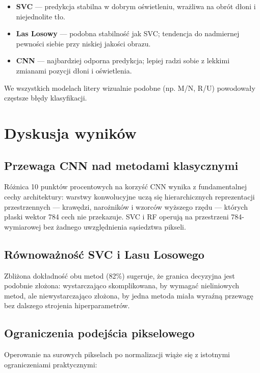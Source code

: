 \begin{itemize}
    \item \textbf{SVC} --- predykcja stabilna w dobrym oświetleniu, wrażliwa
          na obrót dłoni i niejednolite tło.
    \item \textbf{Las Losowy} --- podobna stabilność jak SVC; tendencja do
          nadmiernej pewności siebie przy niskiej jakości obrazu.
    \item \textbf{CNN} --- najbardziej odporna predykcja; lepiej radzi sobie
          z lekkimi zmianami pozycji dłoni i oświetlenia.
\end{itemize}

We wszystkich modelach litery wizualnie podobne (np. M/N, R/U) powodowały
częstsze błędy klasyfikacji.

\section{Dyskusja wyników}

\subsection{Przewaga CNN nad metodami klasycznymi}

Różnica 10 punktów procentowych na korzyść CNN wynika z fundamentalnej cechy
architektury: warstwy konwolucyjne uczą się hierarchicznych reprezentacji
przestrzennych --- krawędzi, narożników i wzorców wyższego rzędu --- których
płaski wektor 784 cech nie przekazuje. SVC i RF operują na przestrzeni
784-wymiarowej bez żadnego uwzględnienia sąsiedztwa pikseli.

\subsection{Równoważność SVC i Lasu Losowego}

Zbliżona dokładność obu metod (82\%) sugeruje, że granica decyzyjna
jest podobnie złożona: wystarczająco skomplikowana, by wymagać nieliniowych
metod, ale niewystarczająco złożona, by jedna metoda miała wyraźną przewagę
bez dalszego strojenia hiperparametrów.

\subsection{Ograniczenia podejścia pikselowego}

Operowanie na surowych pikselach po normalizacji wiąże się z istotnymi
ograniczeniami praktycznymi:

